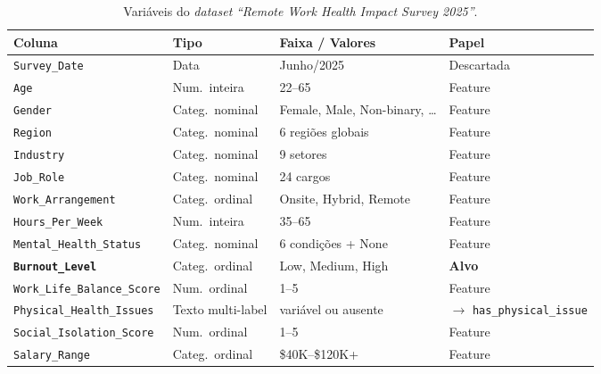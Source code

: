\documentclass[conference]{IEEEtran}
\newcommand{\fonte}[1][elaborado pelos autores.]{%
\par\vspace{1pt}{\footnotesize\centering Fonte: #1\par}}
\begin{document}
\begin{table}[!t]
\centering
\footnotesize
\setlength{\tabcolsep}{3pt}
\caption{Variáveis do \textit{dataset} \textit{``Remote Work Health Impact Survey 2025''}.}
\label{tab:features}
\begin{tabular}{p{}p{}p{}p{}}
\toprule
\textbf{Coluna}            & \textbf{Tipo}     & \textbf{Faixa / Valores}         & \textbf{Papel}                      \\
\midrule
\texttt{Survey_Date}               & Data              & Junho/2025                       & Descartada                          \\
\texttt{Age}                       & Num.\ inteira     & 22--65                           & Feature                             \\
\texttt{Gender}                    & Categ.\ nominal   & Female, Male, Non-binary, \ldots & Feature                             \\
\texttt{Region}                    & Categ.\ nominal   & 6 regiões globais                & Feature                             \\
\texttt{Industry}                  & Categ.\ nominal   & 9 setores                        & Feature                             \\
\texttt{Job_Role}                  & Categ.\ nominal   & 24 cargos                        & Feature                             \\
\texttt{Work_Arrangement}          & Categ.\ ordinal   & Onsite, Hybrid, Remote           & Feature                             \\
\texttt{Hours_Per_Week}            & Num.\ inteira     & 35--65                           & Feature                             \\
\texttt{Mental_Health_Status}      & Categ.\ nominal   & 6 condições + None               & Feature                             \\
\textbf{\texttt{Burnout_Level}}    & Categ.\ ordinal   & Low, Medium, High                & \textbf{Alvo}                       \\
\texttt{Work_Life_Balance_Score}   & Num.\ ordinal     & 1--5                             & Feature                             \\
\texttt{Physical_Health_Issues}    & Texto multi-label & variável ou ausente              & $\to$ \texttt{has_physical_issue} \\
\texttt{Social_Isolation_Score}    & Num.\ ordinal     & 1--5                             & Feature                             \\
\texttt{Salary_Range}              & Categ.\ ordinal   & \$40K--\$120K+                  & Feature                             \\
\bottomrule
\end{tabular}
\fonte
\end{table}
\end{document}
